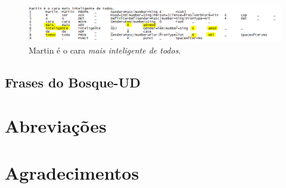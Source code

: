 \documentclass[output=paper,colorlinks,citecolor=brown]{langscibook}
\begin{document}
\begin{figure}
    \centering
    \includegraphics[width=\textwidth,height=\textheight,keepaspectratio]{imagesDrive/image27.png}
    \caption{Martin é o cara \emph{mais inteligente de todos}.}
    \label{fig:comparative2}
\end{figure}{}

\subsection{Frases do Bosque-UD}



\section*{Abreviações}
\section*{Agradecimentos}

\printbibliography[heading=subbibliography,notkeyword=this]
\end{document}
